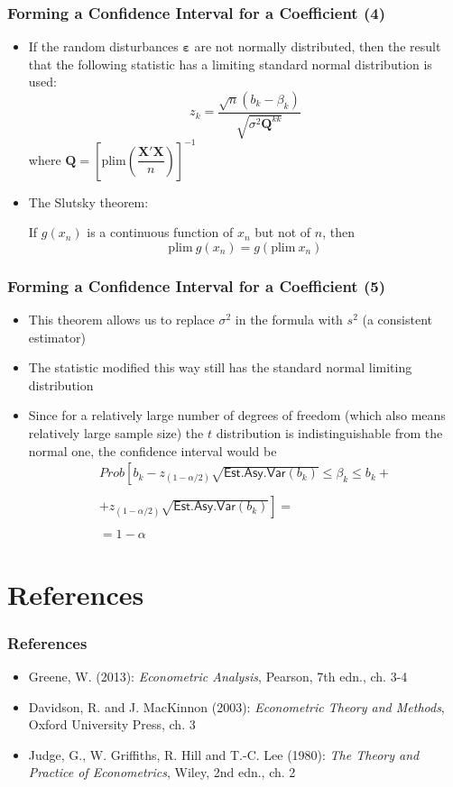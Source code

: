 \documentclass[10pt]{beamer}
\newcommand{\plim}{\mathrm{plim}}
\newcommand{\Esta}{\mathsf{Est.Asy.Var}}
\theoremstyle{definition}
\begin{document}
\begin{frame}[fragile]
	\frametitle{Forming a Confidence Interval for a Coefficient (4)}
	\begin{itemize}
		\item If the random disturbances $ \boldsymbol\varepsilon $ are not normally distributed, then the result that the following statistic has a limiting standard normal distribution is used:
		\[
		z_{k} = \dfrac{\sqrt{n}(b_{k} - \beta_{k})}{\sqrt{\sigma^{2}\mathbf{Q}^{kk}}}
		\]
		where $ \mathbf{Q} = \left[\plim\left(\dfrac{\mathbf{X'X}}{n}\right)\right]^{-1}$ 
		\item The Slutsky theorem:
		\begin{theorem}[Slutsky]
			If $ g(x_{n}) $ is a continuous function of $ x_{n} $ but not of $ n $, then 
			\[
			\plim\ g(x_{n}) = g(\plim\ x_{n})
			\]
		\end{theorem}
	\end{itemize}
\end{frame}

\begin{frame}[fragile]
	\frametitle{Forming a Confidence Interval for a Coefficient (5)}
	\begin{itemize}
		\item This theorem allows us to replace $ \sigma^{2} $ in the formula with $ s^{2} $ (a consistent estimator)
		\item The statistic modified this way still has the standard normal limiting distribution
		\item Since for a relatively large number of degrees of freedom (which also means relatively large sample size) the $ t $ distribution is indistinguishable from the normal one, the confidence interval would be
		\[
		\begin{array}{lcl}
		Prob\left[b_{k} - z_{(1 - \alpha/2)}\sqrt{\Esta(b_{k})} \leq \beta_{k} \leq b_{k} + \right. \\
		\quad\\
		\left. + z_{(1 - \alpha/2)}\sqrt{\Esta(b_{k})}\right] = \\
		\quad\\
		= 1 - \alpha
		\end{array}
		\]
	\end{itemize}
\end{frame}

\section{References}
\begin{frame}[fragile]
\frametitle{References}
\begin{itemize}
	\item Greene, W. (2013): \emph{Econometric Analysis}, Pearson, 7th edn., ch. 3-4
	\item Davidson, R. and J. MacKinnon (2003): \emph{Econometric Theory and Methods}, Oxford University Press, ch. 3
	\item Judge, G., W. Griffiths, R. Hill and T.-C. Lee (1980): \emph{The Theory and Practice of Econometrics}, Wiley, 2nd edn., ch. 2
\end{itemize}
\end{frame}
\end{document}
